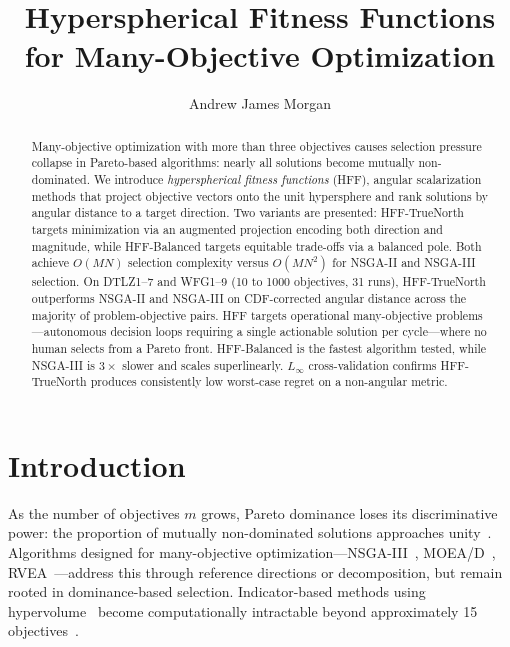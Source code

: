 \documentclass[sigconf]{acmart}
\begin{document}
\title{Hyperspherical Fitness Functions for Many-Objective Optimization}

\author{Andrew James Morgan}

\renewcommand{\shortauthors}{Morgan}

\begin{abstract}
Many-objective optimization with more than three objectives causes selection pressure collapse in Pareto-based algorithms: nearly all solutions become mutually non-dominated. We introduce \emph{hyperspherical fitness functions} (HFF), angular scalarization methods that project objective vectors onto the unit hypersphere and rank solutions by angular distance to a target direction. Two variants are presented: HFF-TrueNorth targets minimization via an augmented projection encoding both direction and magnitude, while HFF-Balanced targets equitable trade-offs via a balanced pole. Both achieve $O(MN)$ selection complexity versus $O(MN^2)$ for NSGA-II and NSGA-III selection.
On DTLZ1--7 and WFG1--9 (10 to 1000 objectives, 31 runs), HFF-TrueNorth outperforms NSGA-II and NSGA-III on CDF-corrected angular distance across the majority of problem-objective pairs. HFF targets operational many-objective problems---autonomous decision loops requiring a single actionable solution per cycle---where no human selects from a Pareto front. HFF-Balanced is the fastest algorithm tested, while NSGA-III is $3\times$ slower and scales superlinearly. $L_\infty$ cross-validation confirms HFF-TrueNorth produces consistently low worst-case regret on a non-angular metric.
\end{abstract}

\maketitle

\section{Introduction}
\label{sec:intro}

As the number of objectives $m$ grows, Pareto dominance loses its discriminative power: the proportion of mutually non-dominated solutions approaches unity~\cite{farina2004fuzzy}. Algorithms designed for many-objective optimization---NSGA-III~\cite{deb2014evolutionary}, MOEA/D~\cite{zhang2007moea}, RVEA~\cite{cheng2016reference}---address this through reference directions or decomposition, but remain rooted in dominance-based selection. Indicator-based methods using hypervolume~\cite{zitzler1999evolutionary} become computationally intractable beyond approximately 15 objectives~\cite{beume2009complexity}.
\end{document}
